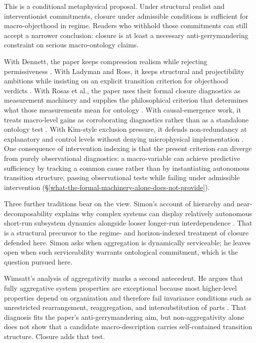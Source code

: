 This is a conditional metaphysical proposal. Under structural realist
and interventionist commitments, closure under admissible conditions is
sufficient for macro-objecthood in regime. Readers who withhold those
commitments can still accept a narrower conclusion: closure is at least
a necessary anti-gerrymandering constraint on serious macro-ontology claims.

With Dennett, the paper
keeps compression realism while rejecting permissiveness \citep{dennett1991}. With Ladyman and Ross, it keeps structural and projectibility
ambitions while insisting on an explicit transition criterion for
objecthood verdicts \citep{ladyman2007}. With Rosas et al., the paper uses their formal closure diagnostics as
measurement machinery and supplies the philosophical
criterion that determines what those measurements mean for ontology
\citep{rosas2024}. With causal-emergence work, it treats macro-level
gains as corroborating diagnostics rather than as a standalone ontology
test \citep{hoel2013,dewhurst2021}. With Kim-style exclusion pressure, it defends
non-redundancy at explanatory and control levels without denying
microphysical implementation \citep{kim1998}. One consequence of
intervention indexing is that the present criterion can diverge from
purely observational diagnostics: a macro-variable can achieve
predictive sufficiency by tracking a common cause rather than by
instantiating autonomous transition structure, passing observational
tests while failing under admissible intervention
(\S\ref{what-the-formal-machinery-alone-does-not-provide}).

Three further traditions bear on the view. Simon's
account of hierarchy and near-decomposability explains why complex
systems can display relatively autonomous short-run subsystem dynamics
alongside looser longer-run interdependence \citep{simon1962,ando1961}.
That is a structural precursor to the regime- and horizon-indexed
treatment of closure defended here. Simon asks when aggregation is
dynamically serviceable; he leaves open when such serviceability
warrants ontological commitment, which is the question pursued here.

Wimsatt's analysis of aggregativity marks a second antecedent. He argues
that fully aggregative system properties are exceptional because most
higher-level properties depend on organization and therefore fail
invariance conditions such as unrestricted rearrangement,
reaggregation, and intersubstitution of parts \citep{wimsatt2000}. That
diagnosis fits the paper's anti-gerrymandering aim, but
non-aggregativity alone does not show that a candidate macro-description
carries self-contained transition structure. Closure adds that test.

